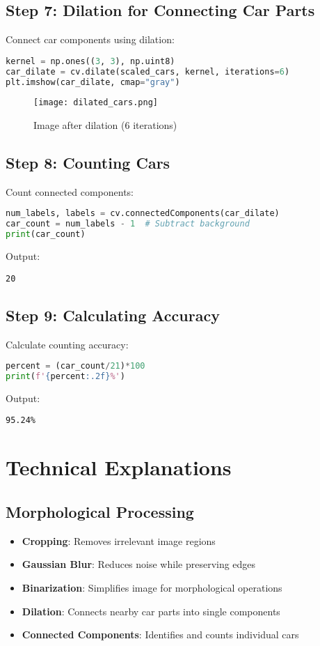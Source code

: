 \documentclass[12pt]{article}
\begin{document}
\subsection{Step 7: Dilation for Connecting Car Parts}
Connect car components using dilation:
\begin{lstlisting}[language=Python]
kernel = np.ones((3, 3), np.uint8)
car_dilate = cv.dilate(scaled_cars, kernel, iterations=6)
plt.imshow(car_dilate, cmap="gray")
\end{lstlisting}

\begin{figure}[H]
    \centering
    \texttt{[image: dilated\_cars.png]}
    \caption{Image after dilation (6 iterations)}
    \label{fig:dilated}
\end{figure}

\subsection{Step 8: Counting Cars}
Count connected components:
\begin{lstlisting}[language=Python]
num_labels, labels = cv.connectedComponents(car_dilate)
car_count = num_labels - 1  # Subtract background
print(car_count)
\end{lstlisting}

Output:
\begin{verbatim}
20
\end{verbatim}

\subsection{Step 9: Calculating Accuracy}
Calculate counting accuracy:
\begin{lstlisting}[language=Python]
percent = (car_count/21)*100
print(f'{percent:.2f}%')
\end{lstlisting}

Output:
\begin{verbatim}
95.24%
\end{verbatim}

\section{Technical Explanations}

\subsection{Morphological Processing}
\begin{itemize}
    \item \textbf{Cropping}: Removes irrelevant image regions
    \item \textbf{Gaussian Blur}: Reduces noise while preserving edges
    \item \textbf{Binarization}: Simplifies image for morphological operations
    \item \textbf{Dilation}: Connects nearby car parts into single components
    \item \textbf{Connected Components}: Identifies and counts individual cars
\end{itemize}
\end{document}
